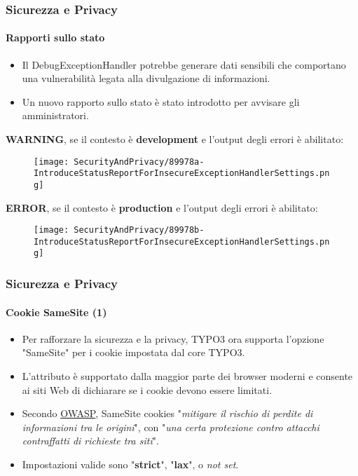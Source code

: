 \begin{frame}[fragile]
	\frametitle{Sicurezza e Privacy}
	\framesubtitle{Rapporti sullo stato}

	\begin{itemize}
		\item Il DebugExceptionHandler potrebbe generare dati sensibili che comportano
		    una vulnerabilità legata alla divulgazione di informazioni.
		\item Un nuovo rapporto sullo stato è stato introdotto per avvisare gli amministratori.
	\end{itemize}

	\vspace{0.4cm}
	\textbf{WARNING}, se il contesto è \textbf{development} e l'output degli errori è abilitato:
	\begin{figure}
		\texttt{[image: SecurityAndPrivacy/89978a-IntroduceStatusReportForInsecureExceptionHandlerSettings.png]}
	\end{figure}

	\textbf{ERROR}, se il contesto è \textbf{production} e l'output degli errori è abilitato:
	\begin{figure}
		\texttt{[image: SecurityAndPrivacy/89978b-IntroduceStatusReportForInsecureExceptionHandlerSettings.png]}
	\end{figure}

\end{frame}


\begin{frame}[fragile]
	\frametitle{Sicurezza e Privacy}
	\framesubtitle{Cookie SameSite (1)}

	\begin{itemize}
		\item Per rafforzare la sicurezza e la privacy, TYPO3 ora supporta l'opzione "SameSite"
		    per i cookie impostata dal core TYPO3.
		\item L'attributo è supportato dalla maggior parte dei browser moderni e consente ai siti Web
		    di dichiarare se i cookie devono essere limitati.
		\item Secondo
			\href{https://www.owasp.org/index.php/SameSite}{OWASP}, SameSite cookies\newline
			\small
				"\textit{mitigare il rischio di perdite di informazioni tra le origini}", con\newline
				"\textit{una certa protezione contro attacchi contraffatti di richieste tra siti}".
			\normalsize

		\item Impostazioni valide sono "\textbf{strict}", "\textbf{lax}", o \textit{not set}.
	\end{itemize}

\end{frame}

